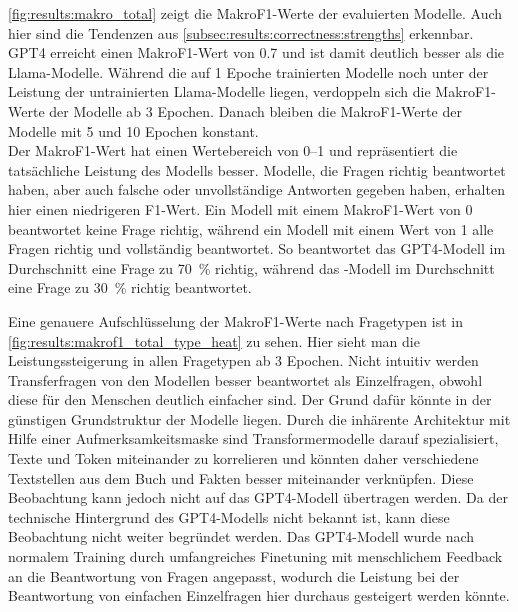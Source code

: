 \cref{fig:results:makro_total} zeigt die MakroF1-Werte der evaluierten Modelle.
Auch hier sind die Tendenzen aus \cref{subsec:results:correctness:strengths} erkennbar.
GPT4 erreicht einen MakroF1-Wert von \num{0.7} und ist damit deutlich besser als die Llama-Modelle.
Während die auf 1 Epoche trainierten Modelle noch unter der Leistung der untrainierten Llama-Modelle liegen, verdoppeln sich die MakroF1-Werte der Modelle ab 3 Epochen.
Danach bleiben die MakroF1-Werte der Modelle mit 5 und 10 Epochen konstant.\\

Der MakroF1-Wert hat einen Wertebereich von \numrange{0}{1} und repräsentiert die tatsächliche Leistung des Modells besser.
Modelle, die Fragen richtig beantwortet haben, aber auch falsche oder unvollständige Antworten gegeben haben, erhalten hier einen niedrigeren F1-Wert.
Ein Modell mit einem MakroF1-Wert von \num{0} beantwortet keine Frage richtig, während ein Modell mit einem Wert von \num{1} alle Fragen richtig und vollständig beantwortet.
So beantwortet das GPT4-Modell im Durchschnitt eine Frage zu \SI{70}{\percent} richtig, während das \lea-Modell im Durchschnitt eine Frage zu \SI{30}{\percent} richtig beantwortet.\\


Eine genauere Aufschlüsselung der MakroF1-Werte nach Fragetypen ist in \cref{fig:results:makrof1_total_type_heat} zu sehen.
Hier sieht man die Leistungssteigerung in allen Fragetypen ab 3 Epochen.
Nicht intuitiv werden Transferfragen von den Modellen besser beantwortet als Einzelfragen, obwohl diese für den Menschen deutlich einfacher sind.
Der Grund dafür könnte in der günstigen Grundstruktur der Modelle liegen.
Durch die inhärente Architektur mit Hilfe einer Aufmerksamkeitsmaske sind Transformermodelle darauf spezialisiert, Texte und Token miteinander zu korrelieren und könnten daher verschiedene Textstellen aus dem Buch und Fakten besser miteinander verknüpfen.
Diese Beobachtung kann jedoch nicht auf das GPT4-Modell übertragen werden.
Da der technische Hintergrund des GPT4-Modells nicht bekannt ist, kann diese Beobachtung nicht weiter begründet werden.
Das GPT4-Modell wurde nach normalem Training durch umfangreiches Finetuning mit menschlichem Feedback an die Beantwortung von Fragen angepasst, wodurch die Leistung bei der Beantwortung von einfachen Einzelfragen hier durchaus gesteigert werden könnte.\\

